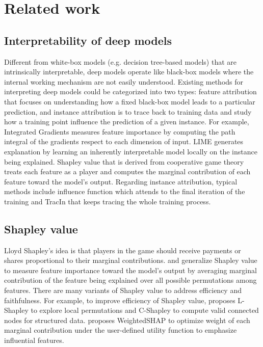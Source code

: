 \section{Related work}
\subsection{Interpretability of deep models}

Different from white-box models (e.g. decision tree-based models) that are intrinsically interpretable, deep models operate like black-box models where the internal working mechanism are not easily understood. Existing methods for interpreting deep models could be categorized into two types: feature attribution that focuses on understanding how a fixed black-box model leads to a particular prediction, and instance attribution is to trace back to training data and study how a training point influence the prediction of a given instance. For example, Integrated Gradients \cite{sundararajan2017axiomatic} measures feature importance by computing the path integral of the gradients respect to each dimension of input. LIME \cite{ribeiro2016should} generates explanation by learning an inherently interpretable model locally on the instance being explained. Shapley value \cite{shapley1953value} that is derived from cooperative game theory treats each feature as a player and computes the marginal contribution of each feature toward the model's output. Regarding instance attribution, typical methods include influence function \cite{koh2017understanding} which attends to the final iteration of the training and TracIn \cite{pruthi2020estimating} that keeps tracing the whole training process.

\subsection{Shapley value}

Lloyd Shapley’s idea \cite{shapley1953value} is that players in the game should receive payments or shares proportional to their marginal contributions. \citet{vstrumbelj2014explaining} and \citet{lundberg2017unified} generalize Shapley value to measure feature importance toward the model's output by averaging marginal contribution of the feature being explained over all possible permutations among features. There are many variants of Shapley value to address efficiency and faithfulness. For example, to improve efficiency of Shapley value, \citet{chen2018shapley} proposes L-Shapley to explore local permutations and C-Shapley to compute valid connected nodes for structured data. \citet{kwon2022weightedshap} proposes WeightedSHAP to optimize weight of each marginal contribution under the user-defined utility function to emphasize influential features. 

